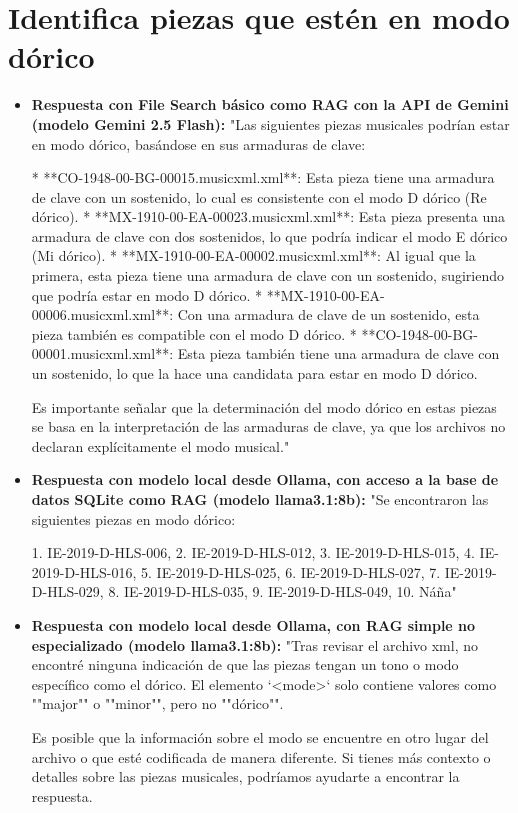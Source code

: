 \section{Identifica piezas que estén en modo dórico}
\begin{itemize}
    \item \textbf{Respuesta con File Search básico como RAG con la API de Gemini (modelo Gemini 2.5 Flash):} "Las siguientes piezas musicales podrían estar en modo dórico, basándose en sus armaduras de clave:

*   **CO-1948-00-BG-00015.musicxml.xml**: Esta pieza tiene una armadura de clave con un sostenido, lo cual es consistente con el modo D dórico (Re dórico).
*   **MX-1910-00-EA-00023.musicxml.xml**: Esta pieza presenta una armadura de clave con dos sostenidos, lo que podría indicar el modo E dórico (Mi dórico).
*   **MX-1910-00-EA-00002.musicxml.xml**: Al igual que la primera, esta pieza tiene una armadura de clave con un sostenido, sugiriendo que podría estar en modo D dórico.
*   **MX-1910-00-EA-00006.musicxml.xml**: Con una armadura de clave de un sostenido, esta pieza también es compatible con el modo D dórico.
*   **CO-1948-00-BG-00001.musicxml.xml**: Esta pieza también tiene una armadura de clave con un sostenido, lo que la hace una candidata para estar en modo D dórico.

Es importante señalar que la determinación del modo dórico en estas piezas se basa en la interpretación de las armaduras de clave, ya que los archivos no declaran explícitamente el modo musical."
    \item \textbf{Respuesta con modelo local desde Ollama, con acceso a la base de datos SQLite como RAG (modelo llama3.1:8b):} "Se encontraron las siguientes piezas en modo dórico:

1. IE-2019-D-HLS-006,
2. IE-2019-D-HLS-012,
3. IE-2019-D-HLS-015,
4. IE-2019-D-HLS-016,
5. IE-2019-D-HLS-025,
6. IE-2019-D-HLS-027,
7. IE-2019-D-HLS-029,
8. IE-2019-D-HLS-035,
9. IE-2019-D-HLS-049,
10. Náña"
    \item \textbf{Respuesta con modelo local desde Ollama, con RAG simple no especializado (modelo llama3.1:8b):} "Tras revisar el archivo xml, no encontré ninguna indicación de que las piezas tengan un tono o modo específico como el dórico. El elemento `<mode>` solo contiene valores como ""major"" o ""minor"", pero no ""dórico"".

Es posible que la información sobre el modo se encuentre en otro lugar del archivo o que esté codificada de manera diferente. Si tienes más contexto o detalles sobre las piezas musicales, podríamos ayudarte a encontrar la respuesta.


\end{itemize}
